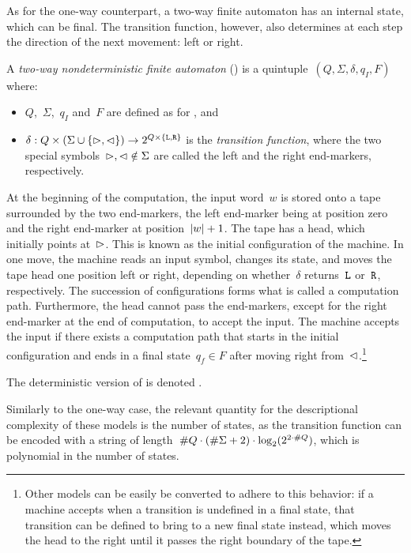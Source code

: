 As for the one-way counterpart, a two-way finite automaton has an internal state, which can be final.
The transition function, however, also determines at each step the direction of the next movement: left or right.

\begin{defn}
	A \emph{two-way nondeterministic finite automaton} (\TNFA) is a quintuple~$(Q,\Sigma,\delta,q_I,F)$ where:
	\begin{itemize}
		\item $Q$,~$\Sigma$,~$q_I$ and~$F$ are defined as for \ONFAs, and
		\item $\delta:Q\times(\Sigma\cup\{\rhd,\lhd\})\to2^{Q\times\{\mathtt L,\mathtt R\}}$ is the \emph{transition function}, where the two special symbols~$\rhd,\lhd\notin\Sigma$ are called the left and the right end-markers, respectively.
	\end{itemize}
	At the beginning of the computation, the input word~$w$ is stored onto a tape surrounded by the two end-markers, the left end-marker being at position zero and the right end-marker at position~$\lvert w \rvert+1$.
	The tape has a head, which initially points at~$\rhd$.
	This is known as the initial configuration of the machine.
	In one move, the machine reads an input symbol, changes its state, and moves the tape head one position left or right, depending on whether~$\delta$ returns~$\mathtt L$ or~$\mathtt R$, respectively.
	The succession of configurations forms what is called a computation path.
	Furthermore, the head cannot pass the end-markers, except for the right end-marker at the end of computation, to accept the input.
	The machine accepts the input if there exists a computation path that starts in the initial configuration and ends in a final state~$q_f\in F$ after moving right from~$\lhd$.\footnote{%
	Other models can be easily be converted to adhere to this behavior: if a machine accepts when a transition is undefined in a final state, that transition can be defined to bring to a new final state instead, which moves the head to the right until it passes the right boundary of the tape.}

	\noindent The deterministic version of \TNFAs is denoted \TDFAs.
\end{defn}

Similarly to the one-way case, the relevant quantity for the descriptional complexity of these models is the number of states, as the transition function can be encoded with a string of length~$\# Q\cdot(\# \Sigma+2)\cdot\log_2(2^{2\cdot\# Q})$, which is polynomial in the number of states.


